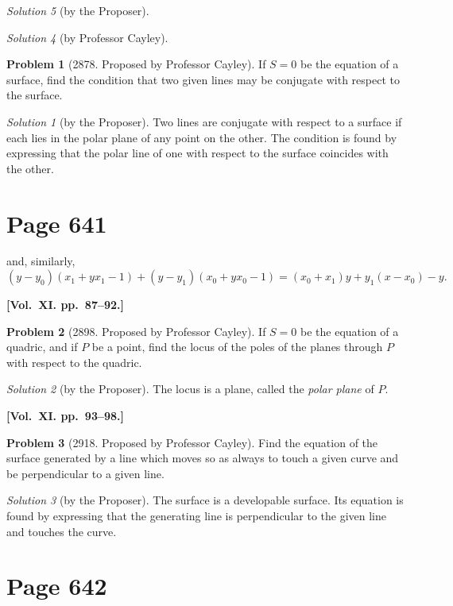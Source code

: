 \documentclass[12pt,a4paper]{article}
\theoremstyle{plain}
\theoremstyle{definition}
\newtheorem{problem}{Problem}
\theoremstyle{remark}
\newtheorem*{solution}{Solution}
\begin{document}
\begin{solution}[by the Proposer]
\begin{solution}[by Professor Cayley]
\begin{problem}[2878. Proposed by Professor Cayley]
If $S = 0$ be the equation of a surface, find the condition that two given lines may be conjugate with respect to the surface.
\end{problem}

\begin{solution}[by the Proposer]
Two lines are conjugate with respect to a surface if each lies in the polar plane of any point on the other. The condition is found by expressing that the polar line of one with respect to the surface coincides with the other.
\end{solution}

\section*{Page 641}
\setcounter{page}{641}

and, similarly,
\[
(y - y_0)(x_1 + yx_1 - 1) + (y - y_1)(x_0 + yx_0 - 1) = (x_0 + x_1)y + y_1(x - x_0) - y.
\]

\medskip\noindent\textbf{[Vol.~XI. pp.~87--92.]}

\begin{problem}[2898. Proposed by Professor Cayley]
If $S = 0$ be the equation of a quadric, and if $P$ be a point, find the locus of the poles of the planes through $P$ with respect to the quadric.
\end{problem}

\begin{solution}[by the Proposer]
The locus is a plane, called the \textit{polar plane} of $P$.
\end{solution}

\medskip\noindent\textbf{[Vol.~XI. pp.~93--98.]}

\begin{problem}[2918. Proposed by Professor Cayley]
Find the equation of the surface generated by a line which moves so as always to touch a given curve and be perpendicular to a given line.
\end{problem}

\begin{solution}[by the Proposer]
The surface is a developable surface. Its equation is found by expressing that the generating line is perpendicular to the given line and touches the curve.
\end{solution}

\section*{Page 642}
\setcounter{page}{642}


\end{solution}
\end{solution}
\end{document}
